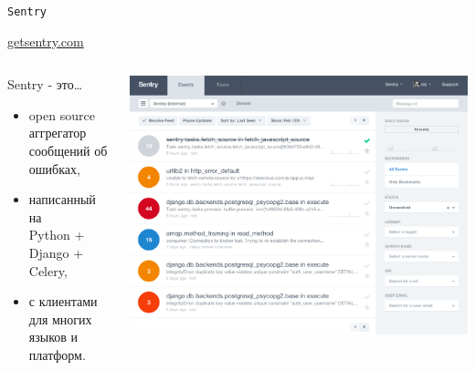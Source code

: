 \documentclass[aspectratio=169]{beamer}
\begin{document}
\begin{frame}
  \begin{center}
    {\Huge {\tt Sentry}} \par
    \url{getsentry.com}
  \end{center}
\end{frame}


\begin{frame}
  \begin{columns}

    \begin{column}{.25\textwidth}
      Sentry - это\ldots
      \begin{itemize}
        \item open source аггрегатор сообщений об ошибках,
        \item написанный на \\Python + \\Django + \\Celery,
        \item с клиентами для многих языков и платформ.
      \end{itemize}
    \end{column}

    \begin{column}{.75\textwidth}
      \begin{center}
        \includegraphics[scale=0.27]{img/sentry1.png}
      \end{center}
    \end{column}

  \end{columns}
\end{frame}
\end{document}
